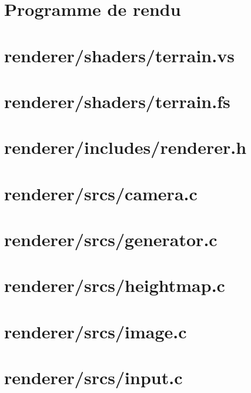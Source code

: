 \documentclass{article}
\begin{document}
\tableofcontents

\fontsize{2.9mm}{2.9mm}
\selectfont

\section{Programme de rendu}

\section*{renderer/shaders/terrain.vs}


\section*{renderer/shaders/terrain.fs}


\section*{renderer/includes/renderer.h}


\section*{renderer/srcs/camera.c}


\section*{renderer/srcs/generator.c}


\section*{renderer/srcs/heightmap.c}


\section*{renderer/srcs/image.c}


\section*{renderer/srcs/input.c}

\end{document}

